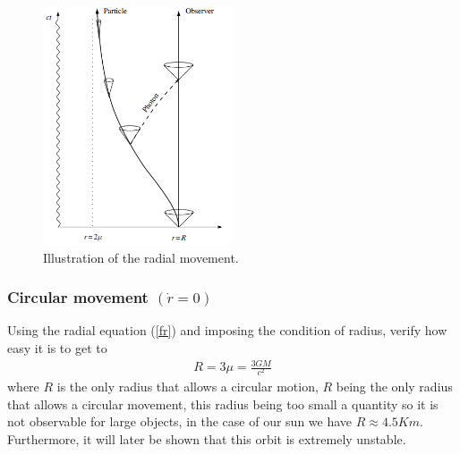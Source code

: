 \documentclass[letterpaper,11pt,onecolumn]{article}
\begin{document}
 \begin{figure}[h!]
    \centering
    \includegraphics[width=0.5\textwidth]{Report/Images/3_foton_radia.png}
    \caption{Illustration of the radial movement.}
\label{radm}
\end{figure}

\subsubsection{Circular movement $(\dot{r}=0)$}
Using the radial equation (\ref{fr}) and imposing the condition of radius, verify how easy it is to get to
\begin{eqnarray*}
          R=3\mu=\frac{3GM}{c^{2}}
\end{eqnarray*}
where $R$ is the only radius that allows a circular motion, $R$ being the only radius that allows a circular movement, this radius being too small a quantity so it is not observable for large objects, in the case of our sun we have $R \approx 4.5 Km$. Furthermore, it will later be shown that this orbit is extremely unstable.
\end{document}
